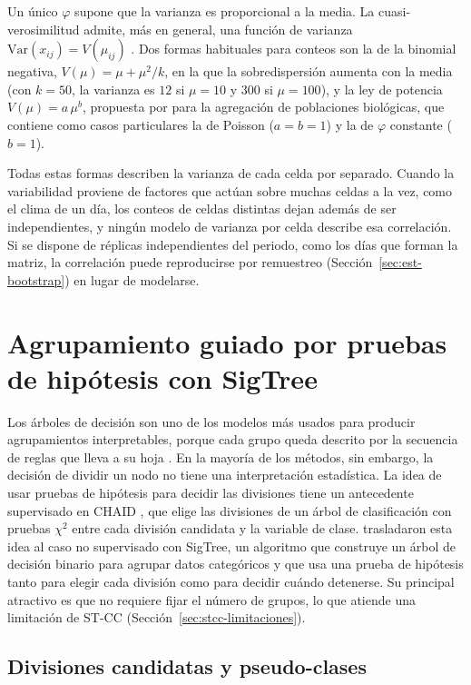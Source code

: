 Un único $\varphi$ supone que la varianza es proporcional a la media. La
cuasi-verosimilitud admite, más en general, una función de varianza
$\mathrm{Var}(x_{ij}) = V(\mu_{ij})$ \cite{McCullagh1989}. Dos formas habituales
para conteos son la de la binomial negativa, $V(\mu) = \mu + \mu^2/k$, en la que
la sobredispersión aumenta con la media (con $k = 50$, la varianza es $12$ si $\mu = 10$ y $300$ si $\mu = 100$), y la ley de potencia
$V(\mu) = a\,\mu^b$, propuesta por \cite{Taylor1961} para la agregación de
poblaciones biológicas, que contiene como casos particulares la de Poisson
($a=b=1$) y la de $\varphi$ constante ($b=1$).

Todas estas formas describen la varianza de cada celda por separado. Cuando la
variabilidad proviene de factores que actúan sobre muchas celdas a la vez, como
el clima de un día, los conteos de celdas distintas dejan además de ser
independientes, y ningún modelo de varianza por celda describe esa correlación.
Si se dispone de réplicas independientes del periodo, como los días que forman
la matriz, la correlación puede reproducirse por remuestreo
(Sección~\ref{sec:est-bootstrap}) en lugar de modelarse.

\section{Agrupamiento guiado por pruebas de hipótesis con SigTree}\label{sec:sigtree}

Los árboles de decisión son uno de los modelos más usados para producir
agrupamientos interpretables, porque cada grupo queda descrito por la secuencia de
reglas que lleva a su hoja \cite{Hu2025}. En la mayoría de los métodos, sin
embargo, la decisión de dividir un nodo no tiene una interpretación estadística.
La idea de usar pruebas de hipótesis para decidir las divisiones tiene un
antecedente supervisado en CHAID \cite{Kass1980}, que elige las divisiones de un
árbol de clasificación con pruebas $\chi^2$ entre cada división candidata y la
variable de clase. \cite{Hu2025} trasladaron esta idea al caso no supervisado con
SigTree, un algoritmo que construye un árbol de decisión binario para agrupar
datos categóricos y que usa una prueba de hipótesis tanto para elegir cada
división como para decidir cuándo detenerse. Su principal atractivo es que no requiere fijar el número de grupos, lo que atiende una limitación de ST-CC (Sección~\ref{sec:stcc-limitaciones}).

\subsection{Divisiones candidatas y pseudo-clases}

